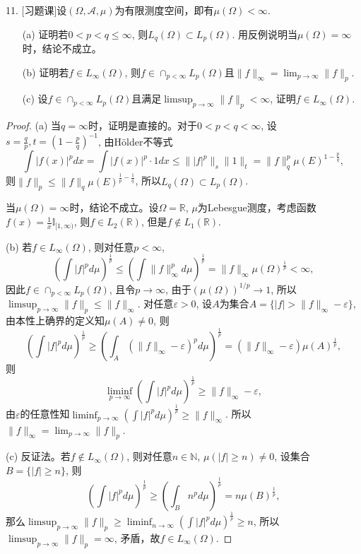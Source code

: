 \documentclass[a4paper,8pt]{ctexart}\textwidth 140mm \textheight 216mm
\newcommand{\e}{\varepsilon}
\newcommand{\8}{\infty}
\begin{document}
11. [习题课]设$(\Omega, \mathcal{A},\mu)$为有限测度空间，即有$\mu(\Omega)<\infty$.
\begin{enumerate}
	\item[(a)] 证明若$0<p<q\leq \infty$, 则$L_q(\Omega)\subset L_p(\Omega)$. 用反例说明当$\mu(\Omega)=\infty$时，结论不成立。
	\item[(b)] 证明若$f\in L_{\infty}(\Omega)$, 则$f\in \cap_{p<\infty}L_p(\Omega)$且$\|f\|_\infty=\lim_{p\to\infty}\|f\|_p$.
	\item[(c)] 设$f\in \cap_{p<\infty}L_p(\Omega)$且满足$\limsup_{p\to\infty}\|f\|_p<\infty$, 证明$f\in L_\infty(\Omega)$.
\end{enumerate}
\begin{proof}
	(a) 当$q=\infty$时，证明是直接的。对于$0<p<q< \infty$, 设$s=\frac{q}{p}, t=(1-\frac{p}{q})^{-1}$, 由H\"older不等式
	\[\int|f(x)|^pdx=\int |f(x)|^p\cdot 1dx\leq \||f|^p\|_s\|1\|_t=\|f\|_q^p\mu(E)^{1-\frac{p}{q}},\]
	则$\|f\|_p\leq \|f\|_q\mu(E)^{\frac{1}{p}-\frac{1}{q}}$, 所以$L_q(\Omega)\subset L_p(\Omega)$.
		
	当$\mu(\Omega)=\infty$时，结论不成立。设$\Omega=\mathbb{R}$, $\mu$为Lebesgue测度，考虑函数$f(x)=\frac{1}{x}\mathbb{I}_{[1,\infty)}$, 则$f\in L_2(\mathbb{R})$, 但是$f\notin L_1(\mathbb{R})$.
	
	(b) 若$f\in L_{\infty}(\Omega)$, 则对任意$p<\infty$,
	\[(\int |f|^pd\mu)^{\frac{1}{p}}\leq (\int \|f\|_\infty^pd\mu)^{\frac{1}{p}}=\|f\|_\infty\mu(\Omega)^{\frac{1}{p}}<\infty,\]
	因此$f\in \cap_{p<\infty}L_p(\Omega)$, 且令$p\to\infty$, 由于$(\mu(\Omega))^{1/p}\to 1$, 所以$\limsup_{p\to\infty}\|f\|_p\leq \|f\|_\infty$. 对任意$\e>0$, 设$A$为集合$A=\{|f|>\|f\|_\infty-\e\}$, 由本性上确界的定义知$\mu(A)\ne 0$, 则
    \[(\int |f|^pd\mu)^{\frac{1}{p}}\geq (\int_A (\|f\|_\infty-\e)^pd\mu)^{\frac{1}{p}}=(\|f\|_\infty-\e)\mu(A)^{\frac{1}{p}},\]
    则
    \[\liminf_{p\to\infty}(\int |f|^pd\mu)^{\frac{1}{p}}\geq \|f\|_\infty-\e,\]
    由$\e$的任意性知$\liminf_{p\to\infty}(\int |f|^pd\mu)^{\frac{1}{p}}\geq \|f\|_\infty$. 所以$\|f\|_\infty=\lim_{p\to\infty}\|f\|_p$.
    
    (c) 反证法。若$f\notin L_\infty(\Omega)$, 则对任意$n\in\mathbb{N}$, $\mu(|f|\geq n)\ne 0$, 设集合$B=\{|f|\geq n\}$, 则
    \[(\int |f|^p d\mu)^{\frac{1}{p}}\geq (\int_B n^pd\mu)^{\frac{1}{p}}=n\mu(B)^{\frac{1}{p}},\]
    那么$\limsup_{p\to\infty}\|f\|_p\geq\liminf_{n\to\infty}(\int |f|^pd\mu)^{\frac{1}{p}}\geq n$,  所以$\limsup_{p\to\infty}\|f\|_p=\infty$, 矛盾，故$f\in L_\infty(\Omega)$.
\end{proof}
\end{document}

